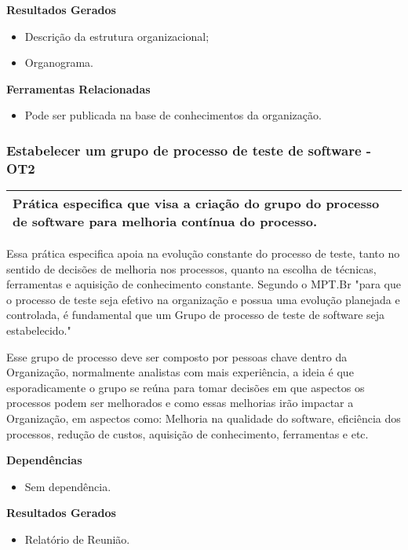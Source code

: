 \textbf{Resultados Gerados}
\begin{itemize}
    \item Descrição da estrutura organizacional;
    \item Organograma.
\end{itemize}

\textbf{Ferramentas Relacionadas}
\begin{itemize}
    \item Pode ser publicada na base de conhecimentos da organização.
\end{itemize}

\subsubsection{Estabelecer um grupo de processo de teste de software - OT2}
\label{sec:ot2}

\begin{table}[H]
\centering
\begin{tabular}{|p{130mm}|}
\hline
Prática especifica que visa a criação do grupo do processo de software para melhoria contínua do processo.\\ 
\hline
\end{tabular}
\end{table}

Essa prática especifica apoia na evolução constante do processo de teste, tanto no sentido de decisões de melhoria nos processos, quanto na escolha de técnicas, ferramentas e aquisição de conhecimento constante. Segundo o MPT.Br \cite{GuiaMPTbr} "para que o processo de teste seja efetivo na organização e possua uma evolução planejada e controlada, é fundamental que um Grupo de processo de teste de software seja estabelecido."

Esse grupo de processo deve ser composto por pessoas chave dentro da Organização, normalmente analistas com mais experiência, a ideia é que esporadicamente o grupo se reúna para tomar decisões em que aspectos os processos podem ser melhorados e como essas melhorias irão impactar a Organização, em aspectos como: Melhoria na qualidade do software, eficiência dos processos, redução de custos, aquisição de conhecimento, ferramentas e etc. 

\textbf{Dependências}
\begin{itemize}
    \item Sem dependência.
\end{itemize}

\textbf{Resultados Gerados}
\begin{itemize}
    \item Relatório de Reunião.
\end{itemize}


